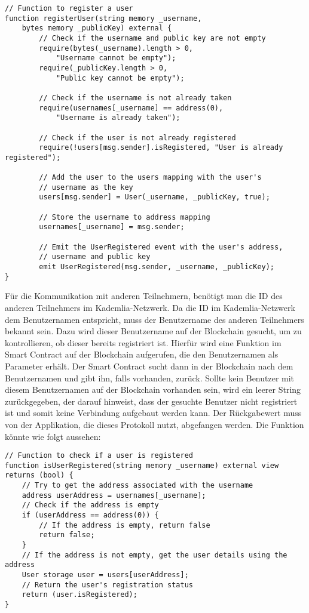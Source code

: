 \begin{lstlisting}[language=Solidity, caption={Registrierung eines Nutzers auf der Blockchain},captionpos=b]
// Function to register a user
function registerUser(string memory _username, 
    bytes memory _publicKey) external {
        // Check if the username and public key are not empty
        require(bytes(_username).length > 0, 
            "Username cannot be empty");
        require(_publicKey.length > 0, 
            "Public key cannot be empty");

        // Check if the username is not already taken
        require(usernames[_username] == address(0), 
            "Username is already taken");

        // Check if the user is not already registered
        require(!users[msg.sender].isRegistered, "User is already registered");

        // Add the user to the users mapping with the user's 
        // username as the key
        users[msg.sender] = User(_username, _publicKey, true);

        // Store the username to address mapping
        usernames[_username] = msg.sender;

        // Emit the UserRegistered event with the user's address, 
        // username and public key
        emit UserRegistered(msg.sender, _username, _publicKey);
}
\end{lstlisting}

\noindent Für die Kommunikation mit anderen Teilnehmern, benötigt man die ID des anderen Teilnehmers im Kademlia-Netzwerk. Da die ID im Kademlia-Netzwerk dem Benutzernamen entspricht, muss der Benutzername des anderen Teilnehmers bekannt sein. Dazu wird dieser Benutzername auf der Blockchain gesucht, um zu kontrollieren, ob dieser bereits registriert ist. Hierfür wird eine Funktion im Smart Contract auf der Blockchain aufgerufen, die den Benutzernamen als Parameter erhält. Der Smart Contract sucht dann in der Blockchain nach dem Benutzernamen und gibt ihn, falls vorhanden, zurück. Sollte kein Benutzer mit diesem Benutzernamen auf der Blockchain vorhanden sein, wird ein leerer String zurückgegeben, der darauf hinweist, dass der gesuchte Benutzer nicht registriert ist und somit keine Verbindung aufgebaut werden kann. Der Rückgabewert muss von der Applikation, die dieses Protokoll nutzt, abgefangen werden. 
Die Funktion könnte wie folgt aussehen:

\begin{lstlisting}[language=Solidity, caption={Suche nach einem Benutzernamen auf der Blockchain},captionpos=b]
// Function to check if a user is registered
function isUserRegistered(string memory _username) external view returns (bool) {
    // Try to get the address associated with the username
    address userAddress = usernames[_username];
    // Check if the address is empty
    if (userAddress == address(0)) {
        // If the address is empty, return false
        return false;
    }
    // If the address is not empty, get the user details using the address
    User storage user = users[userAddress];
    // Return the user's registration status
    return (user.isRegistered);
}
\end{lstlisting}



